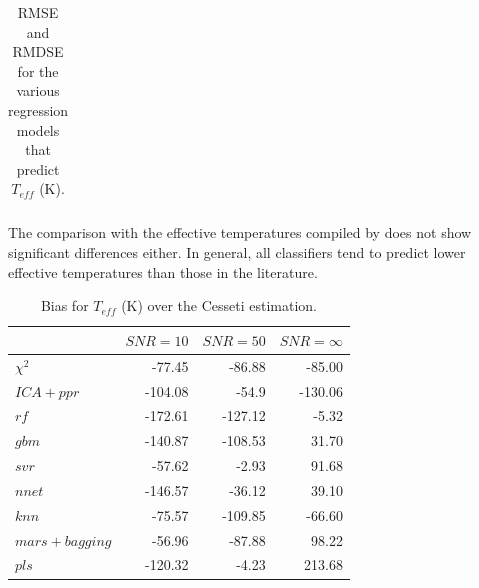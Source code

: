 \begin{table}
\begin{tabular}{@{}rrrcrrcrr@{}}
\bottomrule
\end{tabular}
\caption {RMSE and RMDSE for the various regression models that predict $T_{eff}$ (K).} 
\label{tab:model_TSD} 
\end{table}


The comparison with the effective temperatures compiled
by \cite{cesetti} does not show significant differences either. In
general, all classifiers tend to predict lower effective temperatures
than those in the literature.

\begin{table}\centering
{}
\begin{tabular}{@{}lrrr@{}}\toprule
& {$SNR = 10$} & {$SNR = 50$} & {$SNR = \infty$}\\ \midrule
$\chi^2 $    &  -77.45 & -86.88 & -85.00 \\
$ICA+ppr$ & -104.08 & -54.9 & -130.06 \\
$rf $ & -172.61 & -127.12 & -5.32 \\
$gbm $ & -140.87 & -108.53 & 31.70 \\
$svr $ & -57.62 & -2.93 & 91.68 \\
$nnet$ & -146.57 & -36.12 & 39.10 \\
$knn $ & -75.57 & -109.85 & -66.60 \\
$mars + bagging $& -56.96 & -87.88 & 98.22 \\
$pls $ & -120.32 & -4.23 & 213.68 \\

\bottomrule
\end{tabular}
\caption {Bias for $T_{eff}$ (K) over the Cesseti estimation.} 
\label{tab:model_Tbias} 
\end{table}



